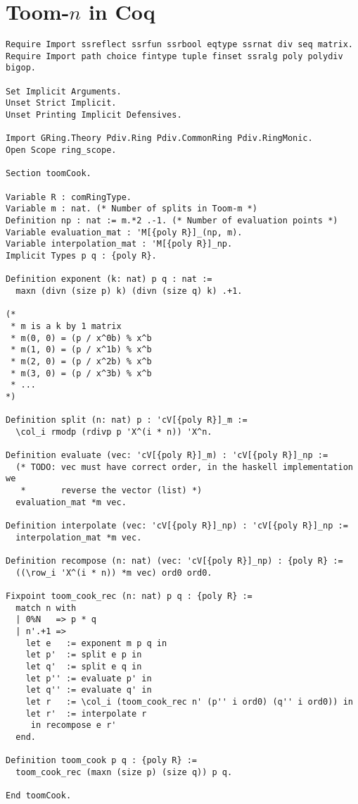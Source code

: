 \section{Toom-$n$ in Coq}
\begin{verbatim}
Require Import ssreflect ssrfun ssrbool eqtype ssrnat div seq matrix.
Require Import path choice fintype tuple finset ssralg poly polydiv bigop.

Set Implicit Arguments.
Unset Strict Implicit.
Unset Printing Implicit Defensives.

Import GRing.Theory Pdiv.Ring Pdiv.CommonRing Pdiv.RingMonic.
Open Scope ring_scope.

Section toomCook.

Variable R : comRingType.
Variable m : nat. (* Number of splits in Toom-m *)
Definition np : nat := m.*2 .-1. (* Number of evaluation points *)
Variable evaluation_mat : 'M[{poly R}]_(np, m).
Variable interpolation_mat : 'M[{poly R}]_np.
Implicit Types p q : {poly R}.

Definition exponent (k: nat) p q : nat :=
  maxn (divn (size p) k) (divn (size q) k) .+1.

(*
 * m is a k by 1 matrix
 * m(0, 0) = (p / x^0b) % x^b
 * m(1, 0) = (p / x^1b) % x^b
 * m(2, 0) = (p / x^2b) % x^b
 * m(3, 0) = (p / x^3b) % x^b
 * ...
*)

Definition split (n: nat) p : 'cV[{poly R}]_m :=
  \col_i rmodp (rdivp p 'X^(i * n)) 'X^n.

Definition evaluate (vec: 'cV[{poly R}]_m) : 'cV[{poly R}]_np :=
  (* TODO: vec must have correct order, in the haskell implementation we
   *       reverse the vector (list) *)
  evaluation_mat *m vec.

Definition interpolate (vec: 'cV[{poly R}]_np) : 'cV[{poly R}]_np :=
  interpolation_mat *m vec.

Definition recompose (n: nat) (vec: 'cV[{poly R}]_np) : {poly R} :=
  ((\row_i 'X^(i * n)) *m vec) ord0 ord0.

Fixpoint toom_cook_rec (n: nat) p q : {poly R} :=
  match n with
  | 0%N   => p * q
  | n'.+1 =>
    let e   := exponent m p q in
    let p'  := split e p in
    let q'  := split e q in
    let p'' := evaluate p' in
    let q'' := evaluate q' in
    let r   := \col_i (toom_cook_rec n' (p'' i ord0) (q'' i ord0)) in
    let r'  := interpolate r
     in recompose e r'
  end.

Definition toom_cook p q : {poly R} :=
  toom_cook_rec (maxn (size p) (size q)) p q.

End toomCook.
\end{verbatim}
